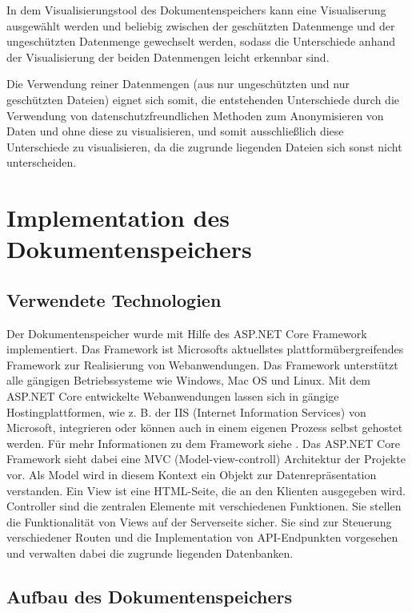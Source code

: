 \documentclass[
    fontsize=12pt,
    headings=small,
    parskip=half,           %
    bibliography=totoc,
    numbers=noenddot,       %
    open=any,               %
    ]{scrreprt}
\begin{document}
In dem Visualisierungstool des Dokumentenspeichers kann eine Visualiserung ausgewählt werden und beliebig zwischen der geschützten Datenmenge und der ungeschützten Datenmenge gewechselt werden, sodass die Unterschiede anhand der Visualisierung der beiden Datenmengen leicht erkennbar sind.

Die Verwendung reiner Datenmengen (aus nur ungeschützten und nur geschützten Dateien) eignet sich somit, die entstehenden Unterschiede durch die Verwendung von datenschutzfreundlichen Methoden zum Anonymisieren von Daten und ohne diese zu visualisieren, und somit ausschließlich diese Unterschiede zu visualisieren, da die zugrunde liegenden Dateien sich sonst nicht unterscheiden. 

    \section{Implementation des Dokumentenspeichers}    
    
    \subsection{Verwendete Technologien}
Der Dokumentenspeicher wurde mit Hilfe des ASP.NET Core Framework implementiert. 
Das Framework ist Microsofts aktuellstes plattformübergreifendes Framework zur Realisierung von Webanwendungen.
Das Framework unterstützt alle gängigen Betriebssysteme wie Windows, Mac OS und Linux.
Mit dem ASP.NET Core entwickelte Webanwendungen lassen sich in gängige Hostingplattformen, wie z. B. der IIS (Internet Information Services) von Microsoft, integrieren oder können auch in einem eigenen Prozess selbst gehostet werden. 
Für mehr Informationen zu dem Framework siehe \cite{ASPDoc}.
Das ASP.NET Core Framework sieht dabei eine MVC (Model-view-controll) Architektur der Projekte vor. 
Als Model wird in diesem Kontext ein Objekt zur Datenrepräsentation verstanden. 
Ein View ist eine HTML-Seite, die an den Klienten ausgegeben wird. Controller sind die zentralen Elemente mit verschiedenen Funktionen. 
Sie stellen die Funktionalität von Views auf der Serverseite sicher.
Sie sind zur Steuerung verschiedener Routen und die Implementation von API-Endpunkten vorgesehen und verwalten dabei die zugrunde liegenden Datenbanken.

\newpage
    \subsection{Aufbau des Dokumentenspeichers}
\end{document}
